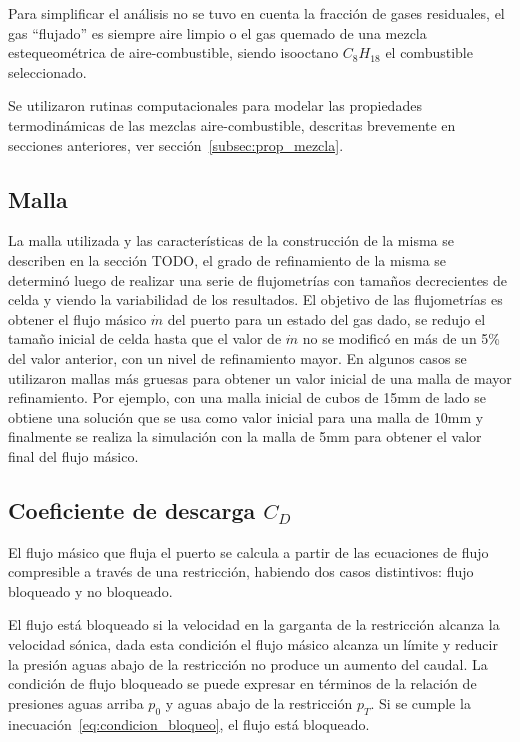 Para simplificar el análisis no se tuvo en cuenta la fracción de gases
residuales, el gas ``flujado'' es siempre aire limpio o el gas quemado de una
mezcla estequeométrica de aire-combustible, siendo isooctano $C_{8}H_{18}$ el
combustible seleccionado.

Se utilizaron rutinas computacionales para modelar las propiedades
termodinámicas de las mezclas aire-combustible, descritas brevemente en
secciones anteriores, ver sección~\ref{subsec:prop_mezcla}.

\subsection{Malla}

La malla utilizada y las características de la construcción de la misma se
describen en la sección TODO, el grado de refinamiento de la misma se determinó
luego de realizar una serie de flujometrías con tamaños decrecientes de celda y
viendo la variabilidad de los resultados.
%
El objetivo de las flujometrías es obtener el flujo másico $\dot{m}$ del puerto
para un estado del gas dado, se redujo el tamaño inicial de celda hasta que el
valor de $\dot{m}$ no se modificó en más de un 5\% del valor anterior, con un
nivel de refinamiento mayor.
%
En algunos casos se utilizaron mallas más gruesas para obtener un valor inicial
de una malla de mayor refinamiento.
%
Por ejemplo, con una malla inicial de cubos de 15mm de lado se obtiene una
solución que se usa como valor inicial para una malla de 10mm y finalmente se
realiza la simulación con la malla de 5mm para obtener el valor final del flujo
másico.

\subsection{Coeficiente de descarga $C_{D}$}\label{sec:cap2_cd}

El flujo másico que fluja el puerto se calcula a partir de las ecuaciones de
flujo compresible a través de una restricción, habiendo dos casos distintivos:
flujo bloqueado y no bloqueado.

El flujo está bloqueado si la velocidad en la garganta de la restricción alcanza
la velocidad sónica, dada esta condición el flujo másico alcanza un límite y
reducir la presión aguas abajo de la restricción no produce un aumento del caudal.
%
La condición de flujo bloqueado se puede expresar en términos de la relación de
presiones aguas arriba $p_{0}$ y aguas abajo de la restricción $p_{T}$.
%
Si se cumple la inecuación~\ref{eq:condicion_bloqueo}, el flujo está bloqueado.

